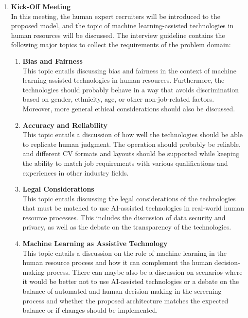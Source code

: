 \documentclass[draft,final]{thesisclass} %
\begin{document}
\begin{enumerate}
    \item \textbf{Kick-Off Meeting} \label{kick_off_meeting}\\ 
    In this meeting, the human expert recruiters will be introduced to the proposed model, and the topic of machine learning-assisted technologies in human resources will be discussed.
    The interview guideline contains the following major topics to collect the requirements of the problem domain:
    \begin{enumerate}
        \item \textbf{Bias and Fairness}\\
        This topic entails discussing bias and fairness in the context of machine learning-assisted technologies in human resources.
        Furthermore, the technologies should probably behave in a way that avoids discrimination based on gender, ethnicity, age, or other non-job-related factors.
        Moreover, more general ethical considerations should also be discussed.
        \item \textbf{Accuracy and Reliability}\\
        This topic entails a discussion of how well the technologies should be able to replicate human judgment.
        The operation should probably be reliable, and different \acs{CV} formats and layouts should be supported while keeping the ability to match job requirements with various qualifications and experiences in other industry fields.
        \item \textbf{Legal Considerations}\\
        This topic entails discussing the legal considerations of the technologies that must be matched to use \acs{AI}-assisted technologies in real-world human resource processes.
        This includes the discussion of data security and privacy, as well as the debate on the transparency of the technologies.
        \item \textbf{Machine Learning as Assistive Technology}\\
        This topic entails a discussion on the role of machine learning in the human resource process and how it can complement the human decision-making process.
        There can maybe also be a discussion on scenarios where it would be better not to use \acs{AI}-assisted technologies or a debate on the balance of automated and human decision-making in the screening process and whether the proposed architecture matches the expected balance or if changes should be implemented.

\end{enumerate}
\end{enumerate}
\end{document}

